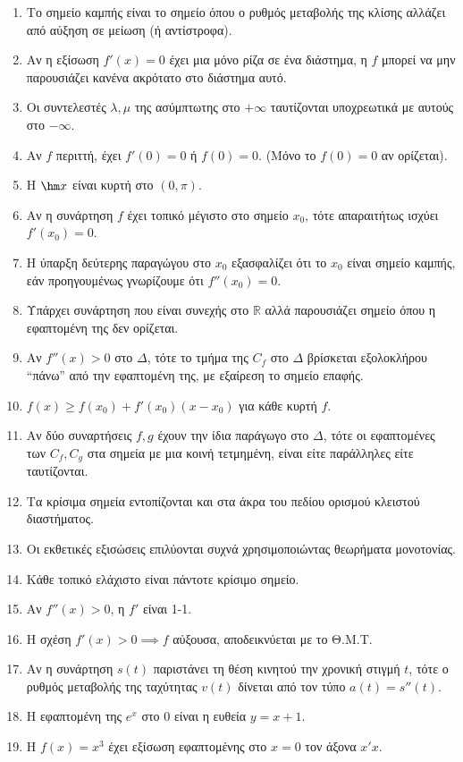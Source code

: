 \documentclass[11pt,a4paper]{article}
\begin{document}
\begin{enumerate}[label=\textbf{2.\arabic*.}]
    \item Το σημείο καμπής είναι το σημείο όπου ο ρυθμός μεταβολής της κλίσης αλλάζει από αύξηση σε μείωση (ή αντίστροφα).
    \item Αν η εξίσωση $f'(x)=0$ έχει μια μόνο ρίζα σε ένα διάστημα, η $f$ μπορεί να μην παρουσιάζει κανένα ακρότατο στο διάστημα αυτό.
    \item Οι συντελεστές $\lambda, \mu$ της ασύμπτωτης στο $+\infty$ ταυτίζονται υποχρεωτικά με αυτούς στο $-\infty$.
    \item Αν $f$ περιττή, έχει $f'(0)=0$ ή $f(0)=0$. (Μόνο το $f(0)=0$ αν ορίζεται).
    \item Η $\hm x$ είναι κυρτή στο $(0, \pi)$.
    \item Αν η συνάρτηση $f$ έχει τοπικό μέγιστο στο σημείο $x_0$, τότε απαραιτήτως ισχύει $f'(x_0) = 0$.
    \item Η ύπαρξη δεύτερης παραγώγου στο $x_0$ εξασφαλίζει ότι το $x_0$ είναι σημείο καμπής, εάν προηγουμένως γνωρίζουμε ότι $f''(x_0)=0$.
    \item Υπάρχει συνάρτηση που είναι συνεχής στο $\mathbb{R}$ αλλά παρουσιάζει σημείο όπου η εφαπτομένη της δεν ορίζεται.
    \item Αν $f''(x)>0$ στο $\Delta$, τότε το τμήμα της $C_f$ στο $\Delta$ βρίσκεται εξολοκλήρου ``πάνω'' από την εφαπτομένη της, με εξαίρεση το σημείο επαφής.
    \item $f(x) \ge f(x_0) + f'(x_0)(x-x_0)$ για κάθε κυρτή $f$.
    \item Αν δύο συναρτήσεις $f, g$ έχουν την ίδια παράγωγο στο $\Delta$, τότε οι εφαπτομένες των $C_f, C_g$ στα σημεία με μια κοινή τετμημένη, είναι είτε παράλληλες είτε ταυτίζονται.
    \item Τα κρίσιμα σημεία εντοπίζονται και στα άκρα του πεδίου ορισμού κλειστού διαστήματος.
    \item Οι εκθετικές εξισώσεις επιλύονται συχνά χρησιμοποιώντας θεωρήματα μονοτονίας.
    \item Κάθε τοπικό ελάχιστο είναι πάντοτε κρίσιμο σημείο.
    \item Αν $f''(x) > 0$, η $f'$ είναι 1-1.
    \item Η σχέση $f'(x)>0 \implies f$ αύξουσα, αποδεικνύεται με το Θ.Μ.Τ.
    \item Αν η συνάρτηση $s(t)$ παριστάνει τη θέση κινητού την χρονική στιγμή $t$, τότε ο ρυθμός μεταβολής της ταχύτητας $v(t)$ δίνεται από τον τύπο $a(t)=s''(t)$.
    \item Η εφαπτομένη της $e^x$ στο 0 είναι η ευθεία $y=x+1$.
    \item Η $f(x)=x^3$ έχει εξίσωση εφαπτομένης στο $x=0$ τον άξονα $x'x$.

\end{enumerate}
\end{document}
